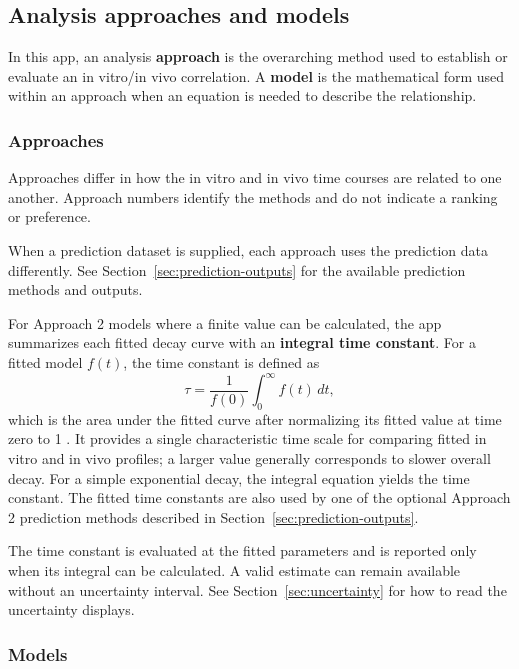 \subsection{Analysis approaches and models}

In this app, an analysis \textbf{approach} is the overarching method used to establish or evaluate an in vitro/in vivo correlation. A \textbf{model} is the mathematical form used within an approach when an equation is needed to describe the relationship.

\subsubsection{Approaches}

Approaches differ in how the in vitro and in vivo time courses are related to one another. Approach numbers identify the methods and do not indicate a ranking or preference.



When a prediction dataset is supplied, each approach uses the prediction data differently. See Section~\ref{sec:prediction-outputs} for the available prediction methods and outputs.

For Approach 2 models where a finite value can be calculated, the app summarizes each fitted decay curve with an \textbf{integral time constant}. For a fitted model $f(t)$, the time constant is defined as
\[
\tau = \frac{1}{f(0)}\int_0^\infty f(t)\,dt,
\]
which is the area under the fitted curve after normalizing its fitted value at time zero to 1 \cite{coffey2017}. It provides a single characteristic time scale for comparing fitted in vitro and in vivo profiles; a larger value generally corresponds to slower overall decay. For a simple exponential decay, the integral equation yields the time constant. The fitted time constants are also used by one of the optional Approach 2 prediction methods described in Section~\ref{sec:prediction-outputs}.

The time constant is evaluated at the fitted parameters and is reported only when its integral can be calculated. A valid estimate can remain available without an uncertainty interval. See Section~\ref{sec:uncertainty} for how to read the uncertainty displays.

\subsubsection{Models}

